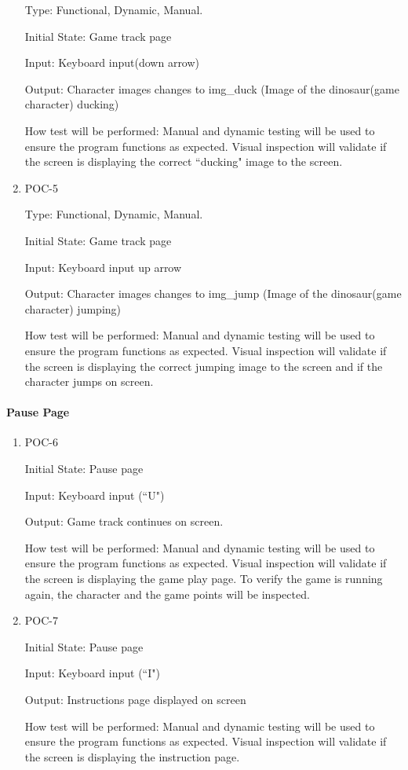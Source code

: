 \documentclass[12pt, titlepage]{article}
\begin{document}
\begin{enumerate}
Type: Functional, Dynamic, Manual.
					
Initial State: Game track page
					
Input: Keyboard input(down arrow) 
					
Output: Character images changes to img\_duck (Image of the dinosaur(game character) ducking)
					
How test will be performed: Manual and dynamic testing will be used to ensure the program functions as expected. Visual inspection will validate if the screen is displaying the correct ``ducking" image to the screen.

\item{POC-5\\}

Type: Functional, Dynamic, Manual.
					
Initial State: Game track page
					
Input: Keyboard input up arrow
					
Output: Character images changes to img\_jump (Image of the dinosaur(game character) jumping)
					
How test will be performed: Manual and dynamic testing will be used to ensure the program functions as expected. Visual inspection will validate if the screen is displaying the correct jumping image to the screen and if the character jumps on screen.



\end{enumerate}

\paragraph{Pause Page}
\begin{enumerate}
    \item{POC-6\\}
					
    Initial State: Pause page
    					
    Input: Keyboard input (``U")
    					
    Output: Game track continues on screen. 
    					
    How test will be performed: Manual and dynamic testing will be used to ensure the program functions as expected. Visual inspection will validate if the screen is displaying the game play page. To verify the game is running again, the character and the game points will be inspected.  
    
    \item{POC-7\\}
					
    Initial State: Pause page
    					
    Input: Keyboard input (``I")
    					
    Output: Instructions page displayed on screen 
    					
    How test will be performed: Manual and dynamic testing will be used to ensure the program functions as expected. Visual inspection will validate if the screen is displaying the instruction page.
\end{enumerate}
\end{document}
